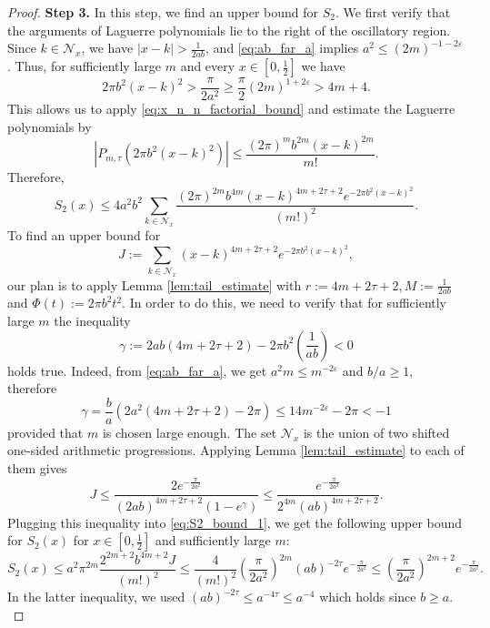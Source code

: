 \documentclass[11pt]{amsart}
\numberwithin{equation}{section}
\begin{document}
\begin{proof}
\textbf{Step 3.} In this step, we find an upper bound for $S_2$. 
We first verify that the arguments of Laguerre polynomials lie to the right of the oscillatory region. Since $k\in \mathcal{N}_x$, we have $|x-k|>\frac{1}{2ab}$, and \eqref{eq:ab_far_a} implies $a^2 \leq (2m)^{-1-2\varepsilon}$. Thus, for sufficiently large $m$ and every $x\in[0,\frac{1}{2}]$ we have
$$
2\pi b^2(x-k)^2 > \frac{\pi}{2a^2}\geq\frac{\pi}{2} (2m)^{1+2\varepsilon}>4m+4.
$$
This allows us to apply \eqref{eq:x_n_n_factorial_bound} and estimate the Laguerre polynomials by
$$
\left|P_{m,\tau}\left(2\pi b^2(x-k)^2\right)\right| \leq \frac{(2\pi)^m b^{2m}(x-k)^{2m}}{m!}.
$$
Therefore,
\begin{equation}\label{eq:S2_bound_1}
    S_2(x)\leq 4a^2b^2 \sum\limits_{k\in \mathcal{N}_x} \frac{(2\pi)^{2m} b^{4m}(x-k)^{4m+2\tau+2} e^{-2\pi b^2(x-k)^2}}{(m!)^2}.
\end{equation}
To find an upper bound for
$$
J:=\sum\limits_{k\in \mathcal{N}_x} (x-k)^{4m+2\tau+2} e^{-2\pi b^2(x-k)^2},
$$
our plan is to apply Lemma \ref{lem:tail_estimate} with $ r:=4m+2\tau+2,  M:=\frac{1}{2ab}$ and $\Phi(t):=2\pi b^2 t^2$. In order to do this, we need to verify that for sufficiently large $m$ the inequality
$$
\gamma := 2ab(4m+2\tau+2) -2\pi b^2\left(\frac{1}{ab}\right)<0
$$
holds true. Indeed, from \eqref{eq:ab_far_a}, we get $a^2 m \leq m^{-2\varepsilon}$ and $b/a \geq 1$, therefore 
$$
\gamma = \frac{b}{a} \left(2a^2 (4m+2\tau+2) - 2\pi\right) \leq 14 m^{-2\varepsilon} - 2\pi< -1
$$
provided that $m$ is chosen large enough.
The set $\mathcal{N}_x$ is the union of two shifted one-sided arithmetic progressions. Applying Lemma \ref{lem:tail_estimate} to each of them gives 
$$
J\leq \frac{2 e^{-\frac{\pi}{2a^2}}}{(2ab)^{4m+2\tau+2}(1-e^{\gamma})} \leq \frac{e^{-\frac{\pi}{2a^2}}}{2^{4m}(ab)^{4m+2\tau+2}}.
$$
Plugging this inequality into \eqref{eq:S2_bound_1}, we get the following upper bound for $S_2(x)$ for $x \in [0,\frac{1}{2}]$ and sufficiently large $m$:
\begin{equation}\label{eq:s2_bound_prelim}
S_2(x) \leq a^2 \pi^{2m} \frac{2^{2m+2}b^{4m+2}J}{(m!)^2}  \leq \frac{4}{(m!)^2} \left(\frac{\pi}{2a^2}\right)^{2m} (ab)^{-2\tau} e^{-\frac{\pi}{2a^2}} \leq  \left(\frac{\pi}{2a^2}\right)^{2m+2} e^{-\frac{\pi}{2a^2}}.  
\end{equation}
In the latter inequality, we used $(ab)^{-2\tau} \leq a^{-4\tau} \leq a^{-4}$ which holds since $b\geq a.$ 


\end{proof}
\end{document}
